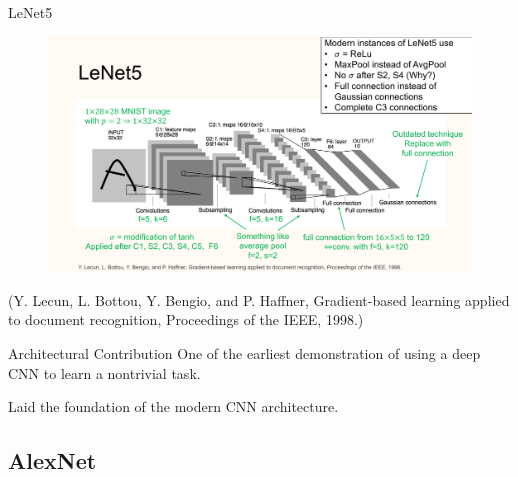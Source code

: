 \begin{frame}[allowframebreaks]

\begin{mydefinitionblock}{7.2}{LeNet5}
    \begin{figure}[H]
        \centering
        \includegraphics[width=1.0\textwidth]{.././assets/7.3.png}
    \end{figure}

    (Y. Lecun, L. Bottou, Y. Bengio, and P. Haffner, Gradient-based learning applied to document recognition, Proceedings of the IEEE, 1998.)
\end{mydefinitionblock}

\end{frame}

\begin{frame}[allowframebreaks]

\begin{myconceptblock}{7.3}{Architectural Contribution}
    One of the earliest demonstration of using a deep CNN to learn a nontrivial task.

    Laid the foundation of the modern CNN architecture.
\end{myconceptblock}

\end{frame}

\subsection{AlexNet}

